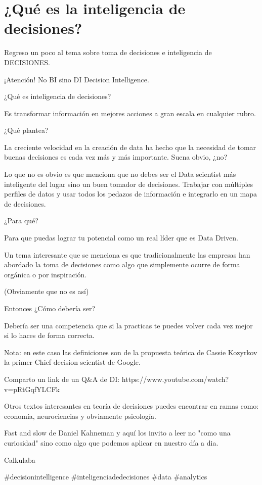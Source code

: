 \chapter{¿Qué es la inteligencia de decisiones?}
\label{Cap1}
Regreso un poco al tema sobre toma de decisiones e inteligencia de DECISIONES. 


¡Atención! No BI sino DI Decision Intelligence. 


¿Qué es inteligencia de decisiones? 


Es transformar información en mejores acciones a gran escala en cualquier rubro. 


¿Qué plantea? 


La creciente velocidad en la creación de data ha hecho que la necesidad de tomar buenas decisiones es cada vez más y más importante. Suena obvio, ¿no? 


Lo que no es obvio es que menciona que no debes ser el Data scientist más inteligente del lugar sino un buen tomador de decisiones. Trabajar con múltiples perfiles de datos y usar todos los pedazos de información e integrarlo en un mapa de decisiones. 


¿Para qué?


Para que puedas lograr tu potencial como un real líder que es Data Driven. 


Un tema interesante que se menciona es que tradicionalmente las empresas han abordado la toma de decisiones como algo que simplemente ocurre de forma orgánica o por inspiración. 


(Obviamente que no es así)


Entonces ¿Cómo debería ser?


Debería ser una competencia que si la practicas te puedes volver cada vez mejor si lo haces de forma correcta. 


Nota: en este caso las definiciones son de la propuesta teórica de Cassie Kozyrkov la primer Chief decision scientist de Google. 


Comparto un link de un Q&A de DI:  https://www.youtube.com/watch?v=pRtGqfYLCFk


Otros textos interesantes en teoría de decisiones puedes encontrar en ramas como: economía, neurociencias y obviamente psicología. 


Fast and slow de Daniel Kahneman y aquí los invito a leer no "como una curiosidad" sino como algo que podemos aplicar en  nuestro día a dia. 


Calkulaba


#decisionintelligence #inteligenciadedecisiones #data #analytics
